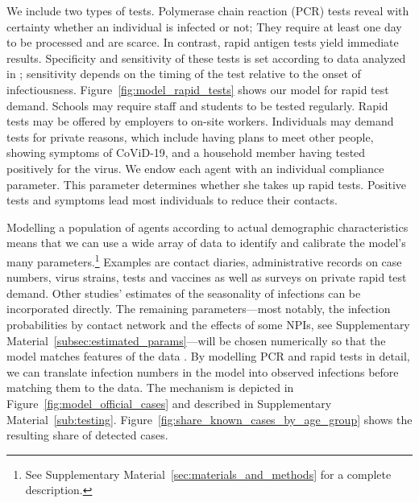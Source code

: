 We include two types of tests. Polymerase chain reaction (PCR) tests reveal with
certainty whether an individual is infected or not; They require at least one day to be
processed and are scarce. In contrast, rapid antigen tests yield immediate results.
Specificity and sensitivity of
these tests is set according to data analyzed in \cite{Bruemmer2021, Smith2021};
sensitivity depends on the timing of the test relative to the onset of infectiousness.
Figure~\ref{fig:model_rapid_tests} shows our model for rapid test demand. Schools may
require staff and students to be tested regularly. Rapid tests may be offered by
employers to on-site workers. Individuals may demand tests for private reasons, which
include having plans to meet other people, showing symptoms of CoViD-19, and a household
member having tested positively for the virus. We endow each agent with an individual
compliance parameter. This parameter determines whether she takes up rapid
tests. Positive tests and symptoms lead most individuals to reduce their contacts.


Modelling a population of agents according to actual demographic characteristics means
that we can use a wide array of data to identify and calibrate the model's many
parameters.\footnote{See Supplementary Material~\ref{sec:materials_and_methods} for a
    complete description.}
Examples are contact diaries, administrative records on case numbers, virus strains,
tests and vaccines as well as surveys on private rapid test demand.
Other studies' estimates of the seasonality of infections can be incorporated
directly. The remaining parameters---most notably, the infection probabilities
by contact network and the effects of some NPIs, see Supplementary
Material~\ref{subsec:estimated_params}---will be chosen numerically so that the model
matches features of the data \citep[see][for the general method]{McFadden1989}. By
modelling PCR and rapid tests in detail, we can translate infection numbers in the model
into observed infections before matching them to the data. The mechanism is
depicted in Figure~\ref{fig:model_official_cases} and described in Supplementary
Material~\ref{sub:testing}. Figure~\ref{fig:share_known_cases_by_age_group}
shows the resulting share of detected cases.


